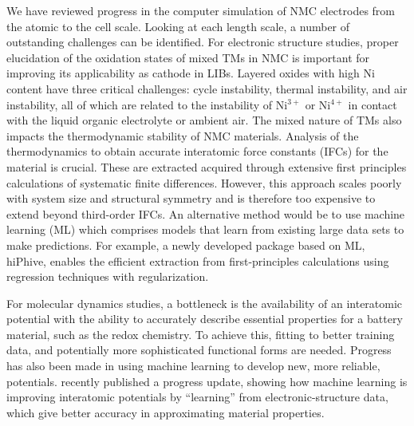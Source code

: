 \documentclass[journal=jacsat,manuscript=article]{achemso}
\begin{document}
We have reviewed progress in the computer simulation of NMC electrodes from the atomic to the cell scale. Looking at each length scale, a number of outstanding challenges can be identified.
For electronic structure studies, proper elucidation of the oxidation states of mixed TMs in NMC is important for improving its applicability as cathode in LIBs. Layered oxides with high Ni content have three critical challenges: cycle instability, thermal instability, and air instability, all of which are related to the instability of Ni$^{3+}$ or Ni$^{4+}$ in contact with the liquid organic electrolyte or ambient air.\cite{Manthiram-NatComm-2020} The mixed nature of TMs also impacts the thermodynamic stability of NMC materials. Analysis of the thermodynamics to obtain accurate interatomic force constants (IFCs) for the material is crucial. These are extracted acquired through extensive first principles calculations of systematic finite differences. However, this approach scales poorly with system size and structural symmetry and is therefore too expensive to extend beyond third-order IFCs. An alternative method would be to use machine learning (ML) which comprises models that learn from existing large data sets to make predictions. For example, a newly developed package based on ML, hiPhive, enables the efficient extraction from first-principles calculations using regression techniques with regularization.\cite{eriksson2019hiphive}

For molecular dynamics studies, a bottleneck is the availability of an interatomic potential with the ability to accurately describe essential properties for a battery material, such as the redox chemistry. To achieve this, fitting to better training data, and potentially more sophisticated functional forms are needed. Progress has also been made in using machine learning to develop new, more reliable, potentials. \citeauthor{deringer2019machine} recently published a progress update, showing how machine learning is improving interatomic potentials by ``learning'' from electronic-structure data, which give better accuracy in approximating material properties. \cite{deringer2019machine}
\end{document}
